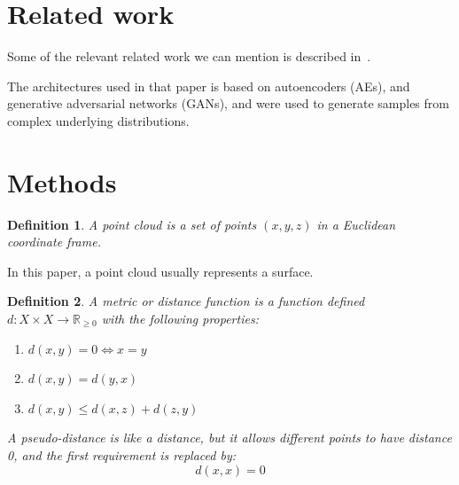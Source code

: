 \documentclass[12pt]{article}
\newtheorem{definition}{Definition}
\newcommand{\contentdescription}[1]{}
\begin{document}
    \section{Related work}
    \contentdescription{
        Related Work (5-15\%):
        Discuss the published work related to your project paper, the types of experiments you do and the additional method that you have added to this work or you have compared this paper with (if any).
    }

    Some of the relevant related work we can mention is described in~\cite{arxiv:1612.00593}.

    The architectures used in that paper is based on autoencoders (AEs)\cite{doi:10.5555/65669.104451}\cite{arxiv:1312.6114},
    and generative adversarial networks (GANs)\cite{NIPS2014_5ca3e9b1}\cite{arxiv:1511.06434}\cite{arxiv:1612.02136},
    and were used to generate samples from complex underlying distributions.


    \section{Methods}
    \contentdescription{
        Methods (15-25\%):
        Describe the original paper's method to the extent that you would need to make your report and findings understandable.
        Otherwise, here you can describe other methods that you compare with or other methods that you apply on top of what you reimplemented.
        Here, you also try to justify any methodical modification or incremental changes that you have added to the original paper.
        It may be helpful to include figures, diagrams, or tables to describe your method or compare it with other methods.
    }

    \begin{definition}
        \normalfont
        A \emph{point cloud} is a set of points $(x, y, z)$ in a Euclidean coordinate frame.
    \end{definition}

    In this paper, a point cloud usually represents a surface.

    \begin{definition}
        \normalfont
        A \emph{metric} or \emph{distance function} is a function defined
        $d: X \times X \to \mathbb{R}_{\geq 0}$
        with the following properties:

        \begin{enumerate}
            \item $d(x,y) = 0 \Leftrightarrow x = y$
            \item $d(x,y) = d(y,x)$
            \item $d(x,y) \leq d(x,z) + d(z,y)$
        \end{enumerate}

        A \emph{pseudo-distance} is like a distance, but it allows different points to have distance 0, and the first requirement is replaced by:
        \[d(x,x) = 0\]
    \end{definition}
\end{document}
